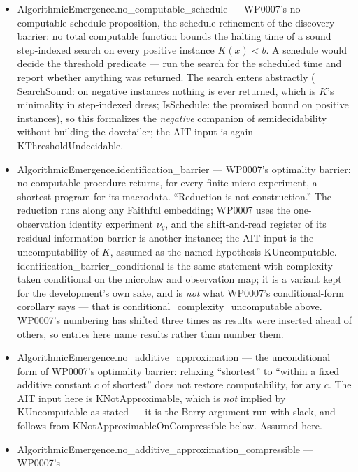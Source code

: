 \documentclass[11pt,a4paper]{article}
\newcommand{\lean}[1]{{\ttfamily\small
  \let\leanunderscore\_\def\_{\leanunderscore\allowbreak}#1}}
\begin{document}
\begin{itemize}[leftmargin=1.4em,itemsep=1pt]
the unwrap bound (2026-08-21 repair). The proposition's scope note --- restricted classes
inherit only when the wrapped generators lie inside them --- is carried by the hypotheses, not
by the theorem.
\item \lean{AlgorithmicEmergence.no\_computable\_schedule} --- WP0007's no-computable-schedule
proposition, the schedule refinement of the discovery barrier: no total computable function bounds the halting
time of a sound step-indexed search on every positive instance $K(x)<b$. A schedule would decide
the threshold predicate --- run the search for the scheduled time and report whether anything was
returned. The search enters abstractly (\lean{SearchSound}: on negative instances nothing is ever
returned, which is $K$'s minimality in step-indexed dress; \lean{IsSchedule}: the promised bound
on positive instances), so this formalizes the \emph{negative} companion of semidecidability
without building the dovetailer; the AIT input is again \lean{KThresholdUndecidable}.
\item \lean{AlgorithmicEmergence.identification\_barrier} --- WP0007's optimality barrier: no
computable
procedure returns, for every finite micro-experiment, a shortest program for its macrodata.
``Reduction is not construction.'' The reduction runs along any \lean{Faithful} embedding;
WP0007 uses the one-observation identity experiment $\nu_y$, and the shift-and-read register of its
residual-information barrier is another instance; the AIT input is the uncomputability of $K$, assumed as the named
hypothesis \lean{KUncomputable}. \lean{identification\_barrier\_conditional} is the same statement with
complexity taken conditional on the microlaw and observation map; it is a variant kept for the
development's own sake, and is \emph{not} what WP0007's conditional-form corollary says --- that
is \lean{conditional\_complexity\_uncomputable} above. WP0007's numbering has shifted three times
as results were inserted ahead of others, so entries here name results rather than number them.
\item \lean{AlgorithmicEmergence.no\_additive\_approximation} --- the unconditional form of
WP0007's optimality barrier: relaxing
``shortest'' to ``within a fixed additive constant $c$ of shortest'' does not restore
computability, for any $c$. The AIT input here is \lean{KNotApproximable}, which is \emph{not}
implied by \lean{KUncomputable} as stated --- it is the Berry argument run with slack, and follows
from \lean{KNotApproximableOnCompressible} below. Assumed here.
\item \lean{AlgorithmicEmergence.no\_additive\_approximation\_compressible} --- WP0007's

\end{itemize}
\end{document}
